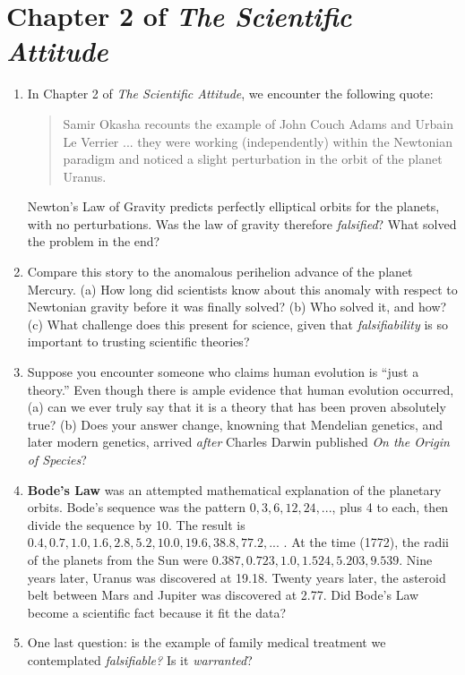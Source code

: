 \documentclass[12pt]{article}
\begin{document}
\maketitle

\section{Chapter 2 of \textit{The Scientific Attitude}}

\begin{enumerate}
\item In Chapter 2 of \textit{The Scientific Attitude}, we encounter the following quote:
\begin{quotation}
Samir Okasha recounts the example of John Couch Adams and Urbain Le Verrier ... they were working (independently) within the Newtonian paradigm and noticed a slight perturbation in the orbit of the planet Uranus.
\end{quotation}
Newton's Law of Gravity predicts perfectly elliptical orbits for the planets, with no perturbations.  Was the law of gravity therefore \textit{falsified}?  What solved the problem in the end? \\ \vspace{0.5cm}
\item Compare this story to the anomalous perihelion advance of the planet Mercury. (a) How long did scientists know about this anomaly with respect to Newtonian gravity before it was finally solved? (b) Who solved it, and how? (c) What challenge does this present for science, given that \textit{falsifiability} is so important to trusting scientific theories? \\ \vspace{0.5cm}
\item Suppose you encounter someone who claims human evolution is ``just a theory.''  Even though there is ample evidence that human evolution occurred, (a) can we ever truly say that it is a theory that has been proven absolutely true?  (b) Does your answer change, knowning that Mendelian genetics, and later modern genetics, arrived \textit{after} Charles Darwin published \textit{On the Origin of Species}? \\ \vspace{1cm}
\item \textbf{Bode's Law} was an attempted mathematical explanation of the planetary orbits.  Bode's sequence was the pattern $0, 3, 6, 12, 24,...$, plus 4 to each, then divide the sequence by 10.  The result is $0.4, 0.7, 1.0, 1.6, 2.8, 5.2, 10.0, 19.6, 38.8, 77.2,...$ .  At the time (1772), the radii of the planets from the Sun were $0.387, 0.723, 1.0, 1.524, 5.203, 9.539$.  Nine years later, Uranus was discovered at 19.18.  Twenty years later, the asteroid belt between Mars and Jupiter was discovered at 2.77.  Did Bode's Law become a scientific fact because it fit the data? \\ \vspace{1cm}
\item One last question: is the example of family medical treatment we contemplated \textit{falsifiable?}  Is it \textit{warranted}?
\end{enumerate}
\end{document}
